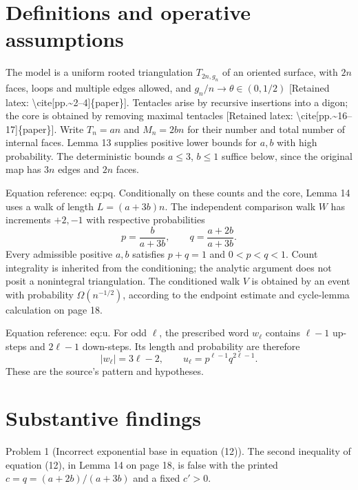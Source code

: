 \documentclass[10pt]{article}
\begin{document}
\section*{Definitions and operative assumptions}
The model is a uniform rooted triangulation \(T_{2n,g_n}\) of an oriented surface, with \(2n\) faces, loops and multiple edges allowed, and \(g_n/n\to\theta\in(0,1/2)\) [Retained latex: \textbackslash{}cite[pp.\textasciitilde{}2--4]\{paper\}]. Tentacles arise by recursive insertions into a digon; the core is obtained by removing maximal tentacles [Retained latex: \textbackslash{}cite[pp.\textasciitilde{}16--17]\{paper\}]. Write \(T_n=an\) and \(M_n=2bn\) for their number and total number of internal faces. Lemma 13 supplies positive lower bounds for \(a,b\) with high probability. The deterministic bounds \(a\leq3\), \(b\leq1\) suffice below, since the original map has \(3n\) edges and \(2n\) faces.\par
Equation reference: eq:pq. Conditionally on these counts and the core, Lemma 14 uses a walk of length \(L=(a+3b)n\). The independent comparison walk \(W\) has increments \(+2,-1\) with respective probabilities \[
p=\frac b{a+3b},\qquad q=\frac{a+2b}{a+3b}.\] Every admissible positive \(a,b\) satisfies \(p+q=1\) and \(0<p<q<1\). Count integrality is inherited from the conditioning; the analytic argument does not posit a nonintegral triangulation. The conditioned walk \(V\) is obtained by an event with probability \(\Omega(n^{-1/2})\), according to the endpoint estimate and cycle-lemma calculation on page 18.\par
Equation reference: eq:u. For odd \(\ell\), the prescribed word \(w_\ell\) contains \(\ell-1\) up-steps and \(2\ell-1\) down-steps. Its length and probability are therefore \[
|w_\ell|=3\ell-2,\qquad u_\ell=p^{\ell-1}q^{2\ell-1}.\] These are the source’s pattern and hypotheses.\par
\section*{Substantive findings}
Problem 1 (Incorrect exponential base in equation (12)).  The second inequality of equation (12), in Lemma 14 on page 18, is false with the printed \(c=q=(a+2b)/(a+3b)\) and a fixed \(c'>0\).\par
\end{document}
